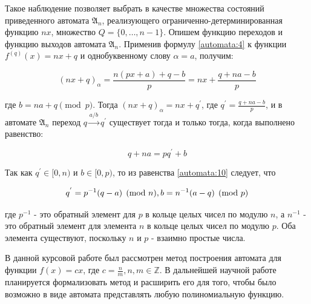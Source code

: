 \documentclass[och, master]{SCWorks}
\theoremstyle{plain}
\theoremstyle{plain}
\theoremstyle{plain}
\theoremstyle{definition}
\begin{document}
Такое наблюдение позволяет выбрать в качестве множества состояний приведенного автомата $\mathfrak{A}_n$, реализующего ограниченно-детерминированная функцию $nx$, множество $Q=\{0, \ldots, n-1 \}$. Опишем функцию переходов и функцию выходов автомата $\mathfrak{A}_n$. Применив формулу \ref{automata:4} к функции $f^{(q)}(x)=nx+q$ и однобуквенному слову $\alpha=a$, получим:


 \begin{equation} \label{automata:9}
 (nx+q)_{\alpha}=\frac{n(px+a)+q-b}{p}=nx+\frac{q+na-b}{p}	
 \end{equation}
 
\noindent где $b=na+q \pmod p$. Тогда $(nx+q)_\alpha = nx + q^{'}$, где $q^{'}=\frac{q+na-b}{p}$, и в автомате $\mathfrak{A}_n$ переход $q \xrightarrow{a/b} q^{'}$ существует тогда и только тогда, когда выполнено равенство:
 
 \begin{equation} \label{automata:10}
 	q+na=pq^{'}+b
 \end{equation}

\noindent Так как $q^{'} \in [0, n)$ и $b \in [0,p)$, то из равенства \ref{automata:10} следует, что

\begin{equation}
q^{'}=p^{-1}(q-a) \pmod n, \\
b=n^{-1}(a-q) \pmod p	
\end{equation}

\noindent где $p^{-1}$ - это обратный элемент для $p$ в кольце целых чисел по модулю $n$, а $n^{-1}$ - это обратный элемент для элемента $n$ в кольце целых чисел по модулю $p$. Оба элемента существуют, поскольку $n$ и $p$ - взаимно простые числа.

\conclusion
В данной курсовой работе был рассмотрен метод построения автомата для функции $f(x)=cx$, где $c=\frac{n}{m}, n,m \in \mathbb Z$. В дальнейшей научной работе планируется формализовать метод и расширить его для того, чтобы было возможно в виде автомата представлять любую полиномиальную функцию. 




\end{document}
